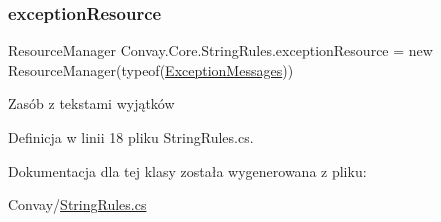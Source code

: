 \subsubsection{\texorpdfstring{exception\+Resource}{exceptionResource}}
{\footnotesize\ttfamily Resource\+Manager Convay.\+Core.\+String\+Rules.\+exception\+Resource = new Resource\+Manager(typeof(\hyperlink{class_convay_1_1_core_1_1_exception_messages}{Exception\+Messages}))\hspace{0.3cm}{\ttfamily [protected]}}



Zasób z tekstami wyjątków 



Definicja w linii 18 pliku String\+Rules.\+cs.



Dokumentacja dla tej klasy została wygenerowana z pliku\+:\begin{DoxyCompactItemize}
\item 
Convay/\hyperlink{_string_rules_8cs}{String\+Rules.\+cs}\end{DoxyCompactItemize}
